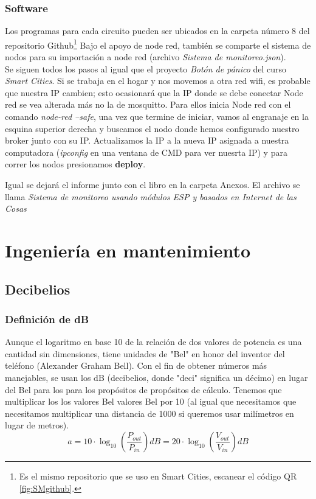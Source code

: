 \documentclass[
	12pt, %
	fleqn, %
	a4paper, %
	oneside, %
]{LegrandOrangeBook}
\begin{document}
\section{Software}
Los programas para cada circuito pueden ser ubicados en la carpeta número 8 del repositorio Github\footnote{Es el mismo repositorio que se uso en Smart Cities, escanear el código QR \ref{fig:SMgithub}.} Bajo el apoyo de node red, también se comparte el sistema de nodos para su importación a node red (archivo \textit{Sistema de monitoreo.json}).\\
Se siguen todos los pasos al igual que el proyecto \textit{Botón de pánico} del curso \textit{Smart Cities}. Si se trabaja en el hogar y nos movemos a otra red wifi, es probable que nuestra IP cambien; esto ocasionará que la IP donde se debe conectar Node red se vea alterada más no la de mosquitto. Para ellos inicia Node red con el comando \textit{node-red --safe}, una vez que termine de iniciar, vamos al engranaje en la esquina superior derecha y buscamos el nodo donde hemos configurado nuestro broker junto con su IP. Actualizamos la IP a la nueva IP asignada a nuestra computadora (\textit{ipconfig} en una ventana de CMD para ver nuesrta IP) y para correr los nodos presionamos \textbf{deploy}.
\begin{notation}
Igual se dejará el informe junto con el libro en la carpeta Anexos. El archivo se llama \textit{Sistema de monitoreo usando módulos ESP y basados en Internet de las Cosas}
\end{notation}
\part{Ingeniería en mantenimiento}
\chapter{Decibelios}\label{chap:decibelios}
\section{Definición de dB}
Aunque el logaritmo en base 10 de la relación de dos valores de potencia es una cantidad sin dimensiones, tiene unidades de "Bel" en honor del inventor del teléfono (Alexander Graham Bell). Con el fin de obtener números más manejables, se usan los dB (decibelios, donde "deci" significa un décimo) en lugar del Bel  para los  para los propósitos de propósitos de cálculo. Tenemos que multiplicar los  los valores Bel valores Bel por 10 (al igual que necesitamos que necesitamos multiplicar una distancia de 1000 si queremos usar milímetros en lugar de metros).
\begin{equation}
\label{art:decibel}
a=10\cdot \log_{10}\left(\frac{P_{out}}{P_{in}}\right)dB = 20\cdot \log_{10}\left(\frac{V_{out}}{V_{in}}\right)dB
\end{equation}
\end{document}
